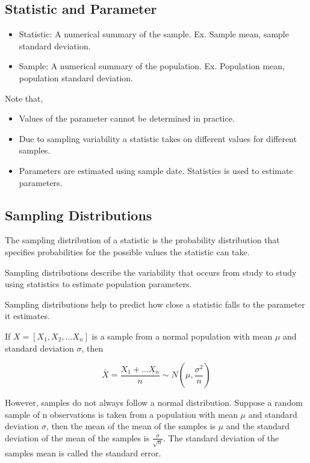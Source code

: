 \documentclass{article}
\begin{document}
    \subsection*{Statistic and Parameter}
    \begin{itemize}
        \item Statistic: A numerical summary of the sample. Ex. Sample mean, sample standard deviation.
        \item Sample: A numerical summary of the population. Ex. Population mean, population standard deviation.
    \end{itemize}

    Note that,
    \begin{itemize}
        \item Values of the parameter cannot be determined in practice.
        \item Due to sampling variability a statistic takes on different values for different samples.
        \item Parameters are estimated using sample date. Statistics is used to estimate parameters.
    \end{itemize}

    \subsection*{Sampling Distributions}
    The sampling distribution of a statistic is the probability distribution that specifies probabilities for the possible
    values the statistic can take.\par
    Sampling distributions describe the variability that occurs from study to study using statistics to estimate population parameters.\par
    Sampling distributions help to predict how close a statistic falls to the 
    parameter it estimates.

    If $X=[X_{1}, X_{2}, ... X_{n}]$ is a sample from a normal population with mean $\mu$ and 
    standard deviation $\sigma$, then

    \begin{equation*}
        \bar{X} = \frac{X_{1}+...X_{n}}{n} \sim N(\mu, \frac{\sigma^{2}}{n})
    \end{equation*}

    However, samples do not always follow a normal distribution. Suppose a random sample of 
    n observations is taken from a population with mean $\mu$ and standard deviation $\sigma$,
    then the mean of the mean of the samples is $\mu$ and the standard deviation of the mean of 
    the samples is $\frac{\sigma}{\sqrt{n}}$. The standard deviation of the samples mean is called the standard error.
    
\end{document}
